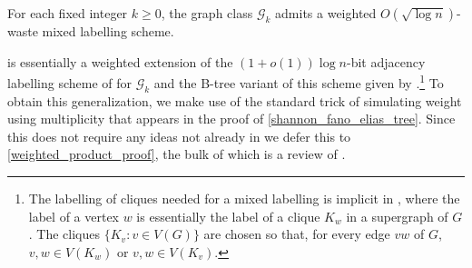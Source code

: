 \documentclass{patmorin}
\renewcommand{\ge}{\geqslant}
\renewcommand{\le}{\leqslant}
\newcommand{\david}[1]{{\color{orange} DW: #1}}
\newcommand{\pat}[1]{\textcolor{Blue}{PaMo: #1}}
\newcommand{\defin}[1]{\emph{\textcolor{brightmaroon}{#1}}}
\DeclareMathOperator{\tw}{tw}
\begin{document}




  \begin{thm}\label{gk_labelling}
    For each fixed integer $k\ge 0$, the graph class $\mathcal{G}_{k}$
    admits a weighted $O(\sqrt{\log n})$-waste mixed labelling scheme.
  \end{thm}


  \label{sketch_start}
   is essentially a weighted extension of the $(1+o(1))\log n$-bit adjacency labelling scheme of \citet{dujmovic.esperet.ea:adjacency} for $\mathcal{G}_k$ and the B-tree variant of this scheme given by \citet{alstrup.rauhe:improved}.\footnote{The labelling of cliques needed for a mixed labelling is implicit in \cite{dujmovic.esperet.ea:adjacency}, where the label of a vertex $w$ is essentially the label of a clique $K_w$ in a supergraph of $G$. The cliques $\{K_v:v\in V(G)\}$ are chosen so that, for every edge $vw$ of $G$, $v,w\in V(K_w)$ or $v,w\in V(K_v)$.}  To obtain this generalization, we make use of the standard trick of simulating weight using multiplicity that appears in the proof of \cref{shannon_fano_elias_tree}.  Since this does not require any ideas not already in \cite{alstrup.rauhe:improved,dujmovic.esperet.ea:adjacency} we defer this to \cref{weighted_product_proof}, the bulk of which is a review of \cite{alstrup.rauhe:improved,dujmovic.esperet.ea:adjacency}.
\end{document}
